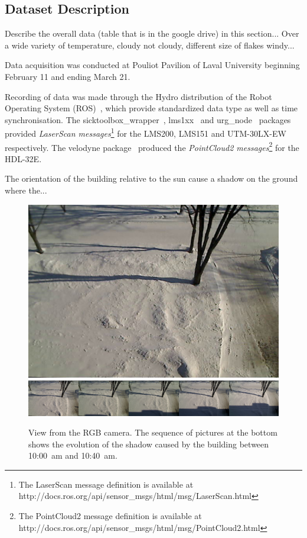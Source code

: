 \subsection{Dataset Description}
Describe the overall data (table that is in the google drive) in this section... Over a wide variety of temperature, cloudy not cloudy, different size of flakes windy...

Data acquisition was conducted at Pouliot Pavilion of Laval University beginning February 11 and ending March 21.

Recording of data was made through the Hydro distribution of the Robot Operating System (ROS)~\cite{ROSWeb}, which provide standardized data type as well as time synchronisation. The sicktoolbox\_wrapper~\cite{LMS200Web}, lms1xx~\cite{LMS151Web} and urg\_node~\cite{HokuyoWeb} packages provided \textit{LaserScan messages}\footnote{The LaserScan message definition is available at http://docs.ros.org/api/sensor\_msgs/html/msg/LaserScan.html} for the LMS200, LMS151 and UTM-30LX-EW respectively. The velodyne package~\cite{VelodyneWeb} produced the \textit{PointCloud2 messages}\footnote{The PointCloud2 message definition is available at http://docs.ros.org/api/sensor\_msgs/html/msg/PointCloud2.html} for the HDL-32E.

The orientation of the building relative to the sun cause a shadow on the ground where the...

\begin{figure}[h]
    \centering
    \includegraphics[width=0.90\linewidth]{./img/camera_view.jpg}
    \includegraphics[width=0.95\linewidth]{./img/shadow2.png}
    \caption{View from the RGB camera. The sequence of pictures at the bottom shows the evolution of the shadow caused by the building between 10:00~am and 10:40~am.}
    \label{fig:setup}
\end{figure}

